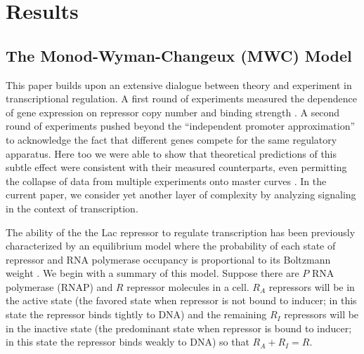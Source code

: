 \pagebreak
\section*{Results}

\subsection*{The Monod-Wyman-Changeux (MWC) Model }



This paper builds upon an extensive dialogue between theory and experiment in
transcriptional regulation. A first round of experiments measured the dependence
of gene expression on repressor copy number and binding strength
\cite{Garcia2011}. A second round of experiments pushed beyond the ``independent
promoter approximation'' to acknowledge the fact that different genes compete
for the same regulatory apparatus.  Here too we were able to show that
theoretical predictions of this subtle effect were consistent with their
measured counterparts, even permitting the collapse of data from multiple
experiments onto master curves \cite{Brewster2014, Weinert2014}. In the current
paper, we consider yet another layer of complexity by analyzing signaling in the
context of transcription.

The ability of the the Lac repressor to regulate transcription has been
previously characterized by an equilibrium model where the probability of each
state of repressor and RNA polymerase occupancy  is proportional to its Boltzmann
weight \cite{Daber2011a, Phillips2015a}. We begin with a summary of this model.
Suppose there are \(P\) RNA polymerase (RNAP) and \(R\) repressor molecules in a
cell. \(R_A\) repressors will be in the active state (the favored state when
repressor is not bound to inducer; in this state the repressor binds tightly to
DNA) and the remaining \(R_I\) repressors will be in the inactive state (the
predominant state when repressor is bound to inducer; in this state the
repressor binds weakly to DNA) so that \(R_A+R_I=R\). 

